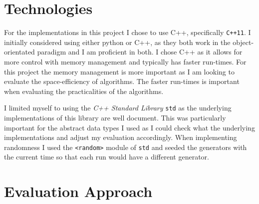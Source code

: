 \documentclass[11pt,twoside,a4paper]{report}
\begin{document}
\section{Technologies}
For the implementations in this project I chose to use C++, specifically \texttt{C++11}. I initially considered using either python or C++, as they both work in the object-orientated paradigm and I am proficient in both. I chose C++ as it allows for more control with memory management and typically has faster run-times. For this project the memory management is more important as I am looking to evaluate the space-efficiency of algorithms. The faster run-times is important when evaluating the practicalities of the algorithms.
\par I limited myself to using the \textit{C++ Standard Library} \texttt{std} as the underlying implementations of this library are well document. This was particularly important for the abstract data types I used as I could check what the underlying implementations and adjust my evaluation accordingly. When implementing randomness I used the \texttt{<random>} module of \texttt{std} and seeded the generators with the current time so that each run would have a different generator.

\section{Evaluation Approach}

\end{document}
